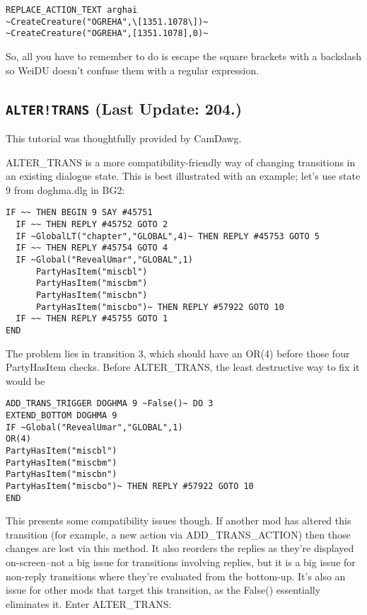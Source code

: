 \documentclass{article}
\def\DEFINE#1{{\tt \bf #1}\label{#1}\index{#1}}
\begin{document}
\begin{verbatim}
REPLACE_ACTION_TEXT arghai
~CreateCreature("OGREHA",\[1351.1078\])~
~CreateCreature("OGREHA",[1351.1078],0)~
\end{verbatim}

So, all you have to remember to do is escape the square brackets with a
backslash so WeiDU doesn't confuse them with a regular expression.

\subsection{\DEFINE{ALTER!TRANS} (Last Update: 204.)}
This tutorial was thoughtfully provided by CamDawg.

ALTER_TRANS is a more compatibility-friendly way of changing transitions in an existing dialogue state. This is best illustrated with an example; let's use state 9 from doghma.dlg in BG2:

\begin{verbatim}
IF ~~ THEN BEGIN 9 SAY #45751
  IF ~~ THEN REPLY #45752 GOTO 2
  IF ~GlobalLT("chapter","GLOBAL",4)~ THEN REPLY #45753 GOTO 5
  IF ~~ THEN REPLY #45754 GOTO 4
  IF ~Global("RevealUmar","GLOBAL",1)
      PartyHasItem("miscbl")
      PartyHasItem("miscbm")
      PartyHasItem("miscbn")
      PartyHasItem("miscbo")~ THEN REPLY #57922 GOTO 10
  IF ~~ THEN REPLY #45755 GOTO 1
END
\end{verbatim}


The problem lies in transition 3, which should have an OR(4) before those four PartyHasItem checks. Before ALTER_TRANS, the least destructive way to fix it would be

\begin{verbatim}
ADD_TRANS_TRIGGER DOGHMA 9 ~False()~ DO 3
EXTEND_BOTTOM DOGHMA 9
IF ~Global("RevealUmar","GLOBAL",1)
OR(4)
PartyHasItem("miscbl")
PartyHasItem("miscbm")
PartyHasItem("miscbn")
PartyHasItem("miscbo")~ THEN REPLY #57922 GOTO 10
END
\end{verbatim}


This presents some compatibility issues though. If another mod has altered this transition (for example, a new action via ADD_TRANS_ACTION) then those changes are lost via this method. It also reorders the replies as they're displayed on-screen--not a big issue for transitions involving replies, but it is a big issue for non-reply transitions where they're evaluated from the bottom-up. It's also an issue for other mods that target this transition, as the False() essentially eliminates it. Enter ALTER_TRANS:
\end{document}
